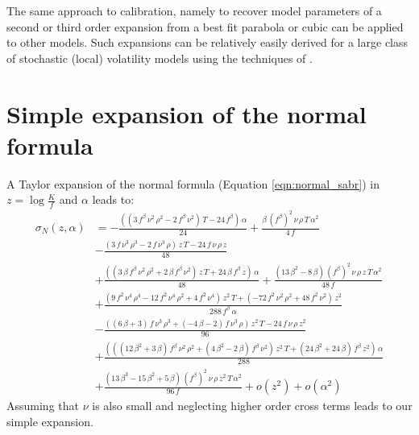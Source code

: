 \documentclass[]{rAMF2e}
\begin{document}
The same approach to calibration, namely to recover model parameters of a second or third order expansion from a best fit parabola or cubic can be applied to other models. Such expansions can be relatively easily derived for a large class of stochastic (local) volatility models using the techniques of \citep{lorig2014implied}.
\newpage
\appendix
\section{Simple expansion of the normal formula}\label{apx:normal_expansion}
A Taylor expansion of the normal formula (Equation \ref{eqn:normal_sabr}) in $z = \log\frac{K}{f}$ and $\alpha$ leads to:
\begin{align*}
\sigma_N(z, \alpha) &=−\frac{\left( \left( 3\,{f}^{\beta}\,{\nu}^{2}\,{\rho}^{2}−2\,{f}^{\beta}\,{\nu}^{2}\right) \,T-24\,{f}^{\beta}\right) \,\alpha}{24}+\frac{\beta\,{\left( {f}^{\beta}\right) }^{2}\,\nu\,\rho\,T\,{\alpha}^{2}}{4\,f}\\
&-\frac{\left( 3\,f\,{\nu}^{3}\,{\rho}^{3}-2\,f\,{\nu}^{3}\,\rho\right) \,z\,T-24\,f\,\nu\,\rho\,z}{48}\\
&+\frac{\left( \left( 3\,\beta\,{f}^{\beta}\,{\nu}^{2}\,{\rho}^{2}+2\,\beta\,{f}^{\beta}\,{\nu}^{2}\right) \,z\,T+24\,\beta\,{f}^{\beta}\,z\right) \,\alpha}{48}+\frac{\left( 13\,{\beta}^{2}-8\,\beta\right) \,{\left( {f}^{\beta}\right) }^{2}\,\nu\,\rho\,z\,T\,{\alpha}^{2}}{48\,f}\\
&+\frac{\left( 9\,{f}^{2}\,{\nu}^{4}\,{\rho}^{4}-12\,{f}^{2}\,{\nu}^{4}\,{\rho}^{2}+4\,{f}^{2}\,{\nu}^{4}\right) \,{z}^{2}\,T+\left( -72\,{f}^{2}\,{\nu}^{2}\,{\rho}^{2}+48\,{f}^{2}\,{\nu}^{2}\right) \,{z}^{2}}{288\,{f}^{\beta}\,\alpha}
\\&-\frac{\left( \left( 6\,\beta+3\right) \,f\,{\nu}^{3}\,{\rho}^{3}+\left( -4\,\beta-2\right) \,f\,{\nu}^{3}\,\rho\right) \,{z}^{2}\,T-24\,f\,\nu\,\rho\,{z}^{2}}{96}\\
&+\frac{\left( \left( \left( 12\,{\beta}^{2}+3\,\beta\right) \,{f}^{\beta}\,{\nu}^{2}\,{\rho}^{2}+\left( 4\,{\beta}^{2}-2\,\beta\right) \,{f}^{\beta}\,{\nu}^{2}\right) \,{z}^{2}\,T+\left( 24\,{\beta}^{2}+24\,\beta\right) \,{f}^{\beta}\,{z}^{2}\right) \,\alpha}{288}\\
&+\frac{\left( 13\,{\beta}^{3}-15\,{\beta}^{2}+5\,\beta\right) \,{\left( {f}^{\beta}\right) }^{2}\,\nu\,\rho\,{z}^{2}\,T\,{\alpha}^{2}}{96\,f}
 + o(z^2)
 + o(\alpha^2)
\end{align*}
Assuming that $\nu$ is also small and neglecting higher order cross terms leads to our simple expansion.
\end{document}
